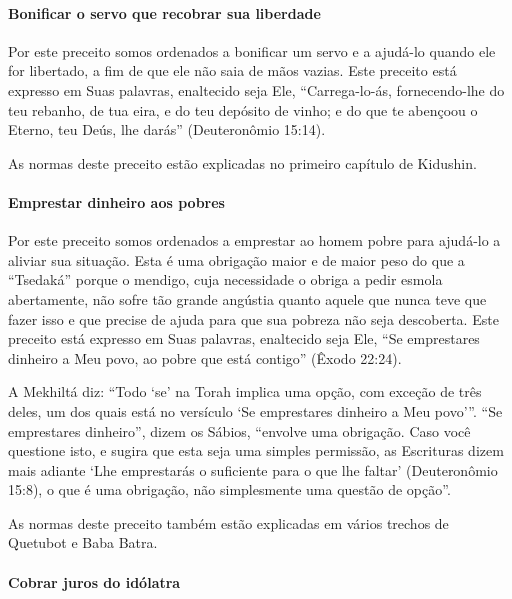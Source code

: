 \paragraph{Bonificar o servo que recobrar sua liberdade}

Por este preceito somos ordenados a bonificar um servo e a ajudá-lo
quando ele for libertado, a fim de que ele não saia de mãos vazias. Este
preceito está expresso em Suas palavras, enaltecido seja Ele,
``Carrega-lo-ás, fornecendo-lhe do teu rebanho, de tua eira, e do teu
depósito de vinho; e do que te abençoou o Eterno, teu Deús, lhe darás'' (Deuteronômio 15:14).

As normas deste preceito estão explicadas no primeiro capítulo de Kidushin.

\paragraph{Emprestar dinheiro aos pobres}

Por este preceito somos ordenados a emprestar ao homem pobre para
ajudá-lo a aliviar sua situação. Esta é uma obrigação maior e de maior
peso do que a ``Tsedaká'' porque o mendigo, cuja necessidade o obriga a
pedir esmola abertamente, não sofre tão grande angústia quanto aquele
que nunca teve que fazer isso e que precise de ajuda para que sua
pobreza não seja descoberta. Este preceito está expresso em Suas
palavras, enaltecido seja Ele, ``Se emprestares dinheiro a Meu povo, ao
pobre que está contigo'' (Êxodo 22:24).

A Mekhiltá diz: ``Todo `se' na Torah implica uma opção, com exceção de
três deles, um dos quais está no versículo `Se emprestares dinheiro a
Meu povo'''. ``Se emprestares dinheiro'', dizem os Sábios, ``envolve uma
obrigação. Caso você questione isto, e sugira que esta seja uma simples
permissão, as Escrituras dizem mais adiante `Lhe emprestarás o
suficiente para o que lhe faltar' (Deuteronômio 15:8), o que é uma
obrigação, não simplesmente uma questão de opção''.

As normas deste preceito também estão explicadas em vários trechos de
Quetubot e Baba Batra.

\paragraph{Cobrar juros do idólatra}


